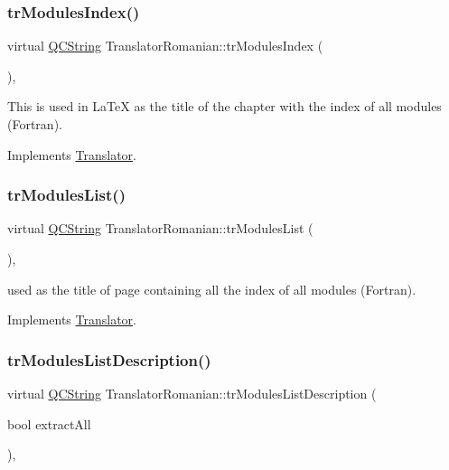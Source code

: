 \subsubsection{\texorpdfstring{trModulesIndex()}{trModulesIndex()}}
{\footnotesize\ttfamily virtual \mbox{\hyperlink{class_q_c_string}{Q\+C\+String}} Translator\+Romanian\+::tr\+Modules\+Index (\begin{DoxyParamCaption}{ }\end{DoxyParamCaption})\hspace{0.3cm}{\ttfamily [inline]}, {\ttfamily [virtual]}}

This is used in La\+TeX as the title of the chapter with the index of all modules (Fortran). 

Implements \mbox{\hyperlink{class_translator}{Translator}}.

\mbox{\label{class_translator_romanian_aa4a2d769e9047ffb0be71fffe20eafa8}} 
\subsubsection{\texorpdfstring{trModulesList()}{trModulesList()}}
{\footnotesize\ttfamily virtual \mbox{\hyperlink{class_q_c_string}{Q\+C\+String}} Translator\+Romanian\+::tr\+Modules\+List (\begin{DoxyParamCaption}{ }\end{DoxyParamCaption})\hspace{0.3cm}{\ttfamily [inline]}, {\ttfamily [virtual]}}

used as the title of page containing all the index of all modules (Fortran). 

Implements \mbox{\hyperlink{class_translator}{Translator}}.

\mbox{\label{class_translator_romanian_a2a602e6c1bc48ca8a4751b4ea27ca798}} 
\subsubsection{\texorpdfstring{trModulesListDescription()}{trModulesListDescription()}}
{\footnotesize\ttfamily virtual \mbox{\hyperlink{class_q_c_string}{Q\+C\+String}} Translator\+Romanian\+::tr\+Modules\+List\+Description (\begin{DoxyParamCaption}\item[{bool}]{extract\+All }\end{DoxyParamCaption})\hspace{0.3cm}{\ttfamily [inline]}, {\ttfamily [virtual]}}


